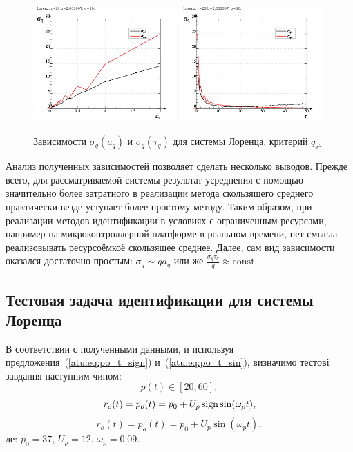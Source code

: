 \begin{figure}[ht!]
\begin{center}
  \includegraphics[width=0.49\textwidth]{p/cha/lor/lor_qx2_tau-p_aq_sd.png}
  \hfill
  \includegraphics[width=0.49\textwidth]{p/cha/lor/lor_qx2_tau-p_tau_sd.png}
\end{center}
  \caption{Зависимости $\sigma_{q}(a_q)$ и $\sigma_{q}(\tau_q)$ для системы Лоренца, критерий $q_{x^2}$}
\label{atu:f:lor_qx2_tau}
\end{figure}

Анализ полученных зависимостей позволяет сделать
несколько выводов. Прежде всего, для рассматриваемой системы
результат усреднения с помощью значительно более затратного
в реализации метода скользящего среднего практически везде
уступает более простому методу. Таким образом,
при реализации методов идентификации в условиях с ограниченным ресурсами,
например на микроконтроллерной платформе в реальном времени,
нет смысла реализовывать ресурсоёмкоё скользящее среднее.
Далее, сам вид зависимости оказался достаточно простым:
$ \sigma_q \sim q a_q $ или же
$ \frac{\sigma_q \tau_q}{q} \approx \mathrm{const}$.



\subsection{Тестовая задача идентификации для системы Лоренца}  %

В соответствии с полученными данными, и используя
предложения~(\ref{atu:eq:po_t_sign}) и~(\ref{atu:eq:po_t_sin}),
%
визначимо тестові завдання наступним чином:
\[
  p(t) \in [20, 60],
\]
%
\begin{equation}
  r_o(t) = p_o(t) = p_0 +  U_{p} \operatorname*{sign} \sin( \omega_{p} t ),
  \label{atu:eq:lor_po_t_sign}
\end{equation}
%
%
\begin{equation}
  r_o(t) = p_o(t) = p_0 +  U_{p} \sin( \omega_{p} t ),
  \label{atu:eq:lor_po_t_sin}
\end{equation}
%
де:
$p_0 = 37$, $U_p=12$, $\omega_p=0.09$.


